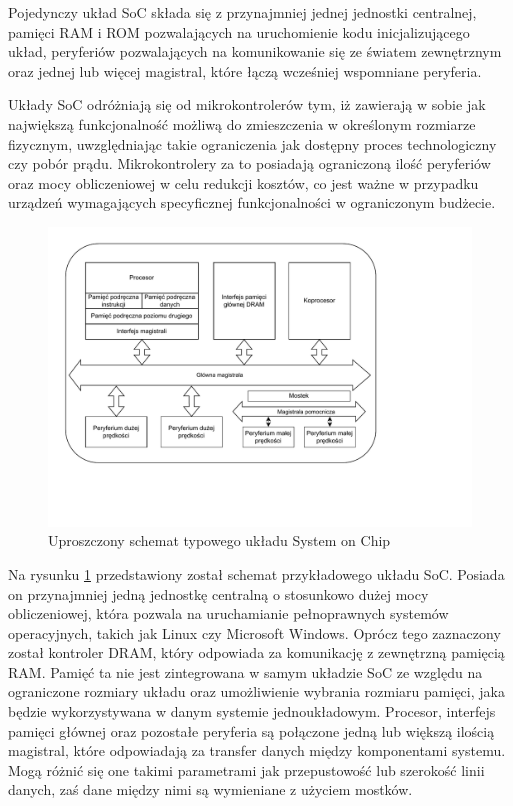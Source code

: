 Pojedynczy układ SoC składa się z przynajmniej jednej jednostki centralnej, pamięci RAM i ROM pozwalających na uruchomienie kodu inicjalizującego układ, peryferiów pozwalających na komunikowanie się ze światem zewnętrznym oraz jednej lub więcej magistral, które łączą wcześniej wspomniane peryferia.

Układy SoC odróżniają się od mikrokontrolerów tym, iż zawierają w sobie jak największą funkcjonalność możliwą do zmieszczenia w określonym rozmiarze fizycznym, uwzględniając takie ograniczenia jak dostępny proces technologiczny czy pobór prądu. Mikrokontrolery za to posiadają ograniczoną ilość peryferiów oraz mocy obliczeniowej w celu redukcji kosztów, co jest ważne w przypadku urządzeń wymagających specyficznej funkcjonalności w ograniczonym budżecie.

\begin{figure}[H]
\centering
\includegraphics[scale=0.7,trim={0 3cm 3cm 0.3cm},clip]{soc-theory/diag-soc-schem.pdf}
\caption{Uproszczony schemat typowego układu System on Chip}
\label{fig:soc-schem}
\end{figure}

Na rysunku \ref{fig:soc-schem} przedstawiony został schemat przykładowego układu SoC. Posiada on przynajmniej jedną jednostkę centralną o stosunkowo dużej mocy obliczeniowej, która pozwala na uruchamianie pełnoprawnych systemów operacyjnych, takich jak Linux czy Microsoft Windows. Oprócz tego zaznaczony został kontroler DRAM, który odpowiada za komunikację z zewnętrzną pamięcią RAM. Pamięć ta nie jest zintegrowana w samym układzie SoC ze względu na ograniczone rozmiary układu oraz umożliwienie wybrania rozmiaru pamięci, jaka będzie wykorzystywana w danym systemie jednoukładowym. Procesor, interfejs pamięci głównej oraz pozostałe peryferia są połączone jedną lub większą ilością magistral, które odpowiadają za transfer danych między komponentami systemu. Mogą różnić się one takimi parametrami jak przepustowość lub szerokość linii danych, zaś dane między nimi są wymieniane z użyciem mostków.

